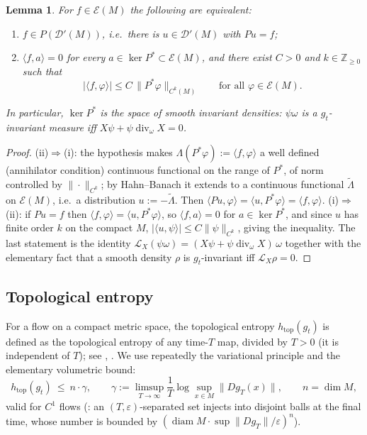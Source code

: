 \documentclass[11pt]{amsart}
\theoremstyle{plain}
\newtheorem{lemma}[theorem]{Lemma}
\theoremstyle{definition}
\theoremstyle{remark}
\newcommand{\DD}{\mathcal{D}'}
\newcommand{\EE}{\mathcal{E}}
\newcommand{\flow}{g_t}
\newcommand{\Lie}{\mathcal{L}}
\begin{document}
\begin{lemma}\label{l:dual}
For $f\in\EE(M)$ the following are equivalent:
\begin{enumerate}
\item[(i)] $f\in P(\DD(M))$, i.e.\ there is $u\in\DD(M)$ with $Pu=f$;
\item[(ii)] $\langle f,a\rangle=0$ for every $a\in \ker P^*\subset\EE(M)$,
\emph{and} there exist $C>0$ and $k\in\mathbb{Z}_{\ge0}$ such that
\[
|\langle f,\varphi\rangle|\le C\,\|P^*\varphi\|_{C^{k}(M)}
\qquad\text{for all }\varphi\in \EE(M).
\]
\end{enumerate}
In particular, $\ker P^*$ is the space of smooth \emph{invariant
densities}: $\psi\omega$ is a $\flow$-invariant measure iff
$X\psi+\psi\operatorname{div}_\omega X=0$.
\end{lemma}

\begin{proof}
(ii)$\Rightarrow$(i): the hypothesis makes
$\Lambda(P^*\varphi):=\langle f,\varphi\rangle$ a well defined
(annihilator condition) continuous functional on the range of $P^*$,
of norm controlled by $\|\cdot\|_{C^{k}}$; by Hahn--Banach it extends
to a continuous functional $\widetilde\Lambda$ on $\EE(M)$, i.e.\ a
distribution $u:=-\widetilde\Lambda$.  Then
$\langle Pu,\varphi\rangle=\langle u,P^*\varphi\rangle
=\langle f,\varphi\rangle$.
(i)$\Rightarrow$(ii): if $Pu=f$ then
$\langle f,\varphi\rangle=\langle u,P^*\varphi\rangle$, so
$\langle f,a\rangle=0$ for $a\in\ker P^*$, and since $u$ has finite
order $k$ on the compact $M$, $|\langle u,\psi\rangle|\le
C\|\psi\|_{C^k}$, giving the inequality.  The last statement is the
identity $\Lie_X(\psi\omega)=(X\psi+\psi\operatorname{div}_\omega
X)\,\omega$ together with the elementary fact that a smooth density
$\rho$ is $\flow$-invariant iff $\Lie_X\rho=0$.
\end{proof}

\subsection{Topological entropy}

For a flow on a compact metric space, the topological entropy
$h_{\mathrm{top}}(\flow)$ is defined as the topological entropy of
any time-$T$ map, divided by $T>0$ (it is independent of $T$); see
\cite[\S3.1]{KH}, \cite{Walters}.  We use repeatedly the variational
principle and the elementary volumetric bound:
\begin{equation}\label{eq:volbound}
h_{\mathrm{top}}(\flow)\ \le\ n\cdot \gamma,\qquad
\gamma:=\limsup_{T\to\infty}\frac1T\log\sup_{x\in M}\|Dg_T(x)\| ,
\qquad n=\dim M,
\end{equation}
valid for $C^1$ flows (\cite[Th.~3.2.9 and Prop.~3.2.17]{KH}: an
$(T,\varepsilon)$-separated set injects into disjoint balls at the
final time, whose number is bounded by
$(\operatorname{diam}M\cdot\sup\|Dg_T\|/\varepsilon)^n$).
\end{document}
